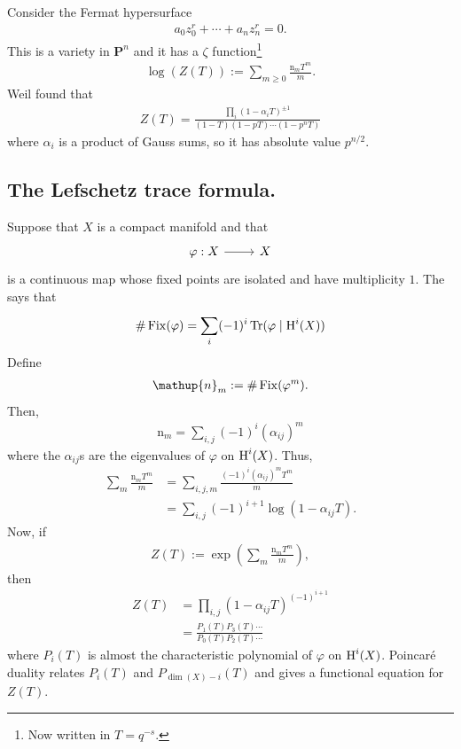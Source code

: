 \documentclass [11 pt, oneside] {article}
\begin{document}
Consider the Fermat hypersurface
\begin{align*}
	a_0z_0^{r}+\cdots+a_{n}z_{n}^{r} =0.
\end{align*}
This is a variety in $\mathbf{P}^{n}$ and it has a $\zeta$ function\footnote{Now written in $T = q^{-s}$.}
\begin{align*}
	\log(Z(T)) := \sum_{m\ge 0}^{} \frac{\mathup{n}_{m}T^{m}}{m}.
\end{align*}
Weil found that 
\begin{align*}
	Z(T) = \frac{\prod_{i} (1-\alpha_{i}T) ^{\pm 1}}{(1-T) (1-pT) \cdots (1-p^{n}T)}
\end{align*}
where $\alpha_{i}$ is a product of Gauss sums, so it has absolute value $p^{n/2}$.

\subsection{The Lefschetz trace formula.}
Suppose that $X$ is a compact manifold and that
\[
\begin{tikzcd}
	\varphi : X\ar[r] &X
\end{tikzcd}
\]
is a continuous map whose fixed points are isolated and have multiplicity $1$. 
The  says that
\begin{align*}
	\#\operatorname{Fix}(\varphi) = \sum_{i}^{} (-1)^{i} \operatorname{Tr}(\varphi\mid \operatorname{H}^{i}(X))
\end{align*}
Define 
\begin{align*}
	\mathup{n}_m := \# \Fix(\varphi^{m}).
\end{align*}
Then,
\begin{align*}
	\mathup{n}_m = \sum_{i,j}^{} (-1) ^{i}(\alpha_{ij}) ^{m}
\end{align*}
where the $\alpha_{ij}$s are the eigenvalues of $\varphi$ on $\operatorname{H}^{i}(X)$.
Thus,
\begin{align*}
	\sum_{m}^{} \frac{\mathup{n}_m T^{m}}{m} &= \sum_{i,j,m}^{}  \frac{(-1) ^{i}(\alpha_{ij}) ^{m}T^{m}}{m}\\
						 &= \sum_{i,j}^{} (-1) ^{i+1} \log(1-\alpha_{ij}T).
\end{align*}
Now, if
\begin{align*}
	Z(T):= \exp \left( \sum_{m}^{} \frac{\mathup{n}_m T^{m}}{m} \right) ,
\end{align*}
then
\begin{align*}
	Z(T) &= \prod_{i,j}(1-\alpha_{ij}T) ^{(-1) ^{i+1}}\\
	     &= \frac{P_1(T) P_3(T) \cdots}{P_0(T) P_2(T)\cdots}
\end{align*}
where $P_{i}(T)$ is almost the characteristic polynomial of $\varphi$ on $\operatorname{H}^{i}(X)$.
Poincar\'e duality relates $P_{i}(T)$ and $P_{\dim(X)-i}(T)$ and gives a functional equation for $Z(T)$. 
\end{document}
